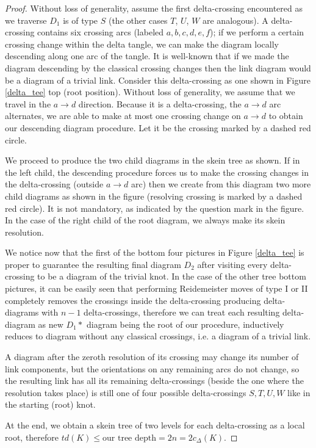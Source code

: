 \documentclass[pdftex, a4paper, 12pt, oneside]{amsart}
\numberwithin{equation}{section}
\theoremstyle{plain}
\theoremstyle{definition}
\begin{document}
\begin{proof}
		Without loss of generality, assume the first delta-crossing encountered as we traverse $D_1$ is of type $S$ (the other cases $T$, $U$, $W$ are analogous). A delta-crossing contains six crossing arcs (labeled $a,b,c,d,e,f$); if we perform a certain crossing change within the delta tangle, we can make the diagram locally descending along one arc of the tangle.  It is well-known that if we made the diagram descending by the classical crossing changes then the link diagram would be a diagram of a trivial link. Consider this delta-crossing as one shown in Figure \ref{delta_tee} top (root position). Without loss of generality, we assume that we travel in the $a\to d$ direction. Because it is a delta-crossing, the $a\to d$ arc alternates, we are able to make at most one crossing change on  $a\to d$ to obtain our descending diagram procedure. Let it be the crossing marked by a dashed red circle.
		\par 
		We proceed to produce the two child diagrams in the skein tree as shown. If in the left child, the descending procedure forces us to make the crossing changes in the delta-crossing (outside $a\to d$ arc) then we create from this diagram two more child diagrams as shown in the figure (resolving crossing is marked by a dashed red circle). It is not mandatory, as indicated by the question mark in the figure. In the case of the right child of the root diagram, we always make its skein resolution.
		\par
		We notice now that the first of the bottom four pictures in Figure \ref{delta_tee} is proper to guarantee the resulting final diagram $D_2$ after visiting every delta-crossing to be a diagram of the trivial knot. In the case of the other tree bottom pictures, it can be easily seen that performing Reidemeister moves of type I or II completely removes the crossings inside the delta-crossing producing delta-diagrams with $n-1$ delta-crossings, therefore we can treat each resulting delta-diagram as new $D_1*$ diagram being the root of our procedure, inductively reduces to diagram without any classical crossings, i.e. a diagram of a trivial link.   
		\par
		A diagram after the zeroth resolution of its crossing may change its number of link components, but the orientations on any remaining arcs do not change, so the resulting link has all its remaining delta-crossings (beside the one where the resolution takes place) is still one of four possible delta-crossings $S, T, U, W$ like in the starting (root) knot.
		\par
		At the end, we obtain a skein tree of two levels for each delta-crossing as a local root, therefore $td(K)\leq \text{our tree depth} =2n=2c_{\Delta}(K)$.
	\end{proof}
	
\end{document}
